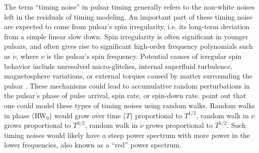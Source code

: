 The term ``timing noise'' in pulsar timing generally refers to the non-white
noises left in the residuals of timing modeling.
An important part of these timing noise are expected to come from pulsar's spin
irregularity, i.e. its long-term deviation from a simple linear slow down. 
Spin irregularity is often significant in younger pulsars, and often
gives rise to significant high-order frequency polynomials such as
$\ddot{\nu}$, where $\nu$ is the pulsar's spin frequency.
Potential causes of irregular spin behavior include unresolved
micro-glitches, internal superfluid turbulence, magnetosphere variations, or external torques caused by matter surrounding the pulsar \citep{hlk10, ymh+13, ml14}.
{\bfref These mechanisms could lead to accumulative random perturbations in the 
pulsar's phase of pulse arrival, spin rate, or spin-down rate. 
\citet{sc10} point out that one could model these types of timing noises using random walks.
Random walks in phase (RW$_0$) would grow over time ($T$) proportional to
$T^{1/2}$, random walk in $\nu$ grows proportional to $T^{3/2}$, random walk in
$\dot{\nu}$ grows proportional to $T^{5/2}$.
Such timing noises would likely have a steep power spectrum with more power in
the lower frequencies, also known as a ``red'' power spectrum.
}

